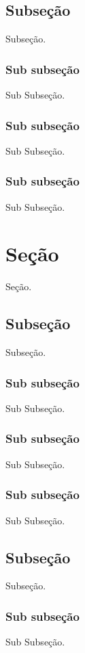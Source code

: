\documentclass[11pt,a4paper]{article}
\begin{document}
\subsection{Subseção}
Subseção.

\subsubsection{Sub subseção}
Sub Subseção.

\subsubsection{Sub subseção}
Sub Subseção.

\subsubsection{Sub subseção}
Sub Subseção.

\section{Seção}
Seção.

\subsection{Subseção}\label{sec:subsec2}
Subseção.

\subsubsection{Sub subseção}
Sub Subseção.

\subsubsection{Sub subseção}
Sub Subseção.

\subsubsection{Sub subseção}
Sub Subseção.

\subsection{Subseção}
Subseção.

\subsubsection{Sub subseção}
Sub Subseção.
\end{document}
